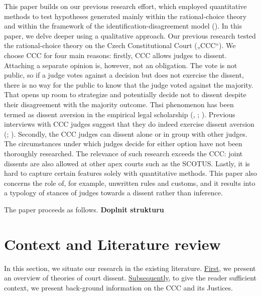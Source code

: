 \documentclass[
  11pt,
]{article}
\begin{document}
This paper builds on our previous research effort, which employed quantitative methods to test hypotheses generated mainly within the rational-choice theory and within the framework of the identification-disagreement model (). In this paper, we delve deeper using a qualitative approach. Our previous research tested the rational-choice theory on the Czech Constitutional Court („CCC``). We choose CCC for four main reasons: firstly, CCC allows judges to dissent. Attaching a separate opinion is, however, not an obligation. The vote is not public, so if a judge votes against a decision but does not exercise the dissent, there is no way for the public to know that the judge voted against the majority. That opens up room to strategize and potentially decide not to dissent despite their disagreement with the majority outcome. Thsi phenomenon has been termed as dissent aversion in the empirical legal scholarship (, ; ). Previous interviews with CCC judges suggest that they do indeed exercise dissent aversion (; ). Secondly, the CCC judges can dissent alone or in group with other judges. The circumstances under which judges decide for either option have not been thoroughly researched. The relevance of such research exceeds the CCC: joint dissents are also allowed at other apex courts such as the SCOTUS. Lastly, it is hard to capture certain features solely with quantitative methods. This paper also concerns the role of, for example, unwritten rules and customs, and it results into a typology of stances of judges towards a dissent rather than inference.

The paper proceeds as follows. \textbf{Doplnit strukturu}

\section{Context and Literature review}\label{context-and-literature-review}

In this section, we situate our research in the existing literature. \hyperref[theory-dissent]{First}, we present an overview of theories of court dissent. \hyperref[primer]{Subsequently}, to give the reader sufficient context, we present back-ground information on the CCC and its Justices.
\end{document}
